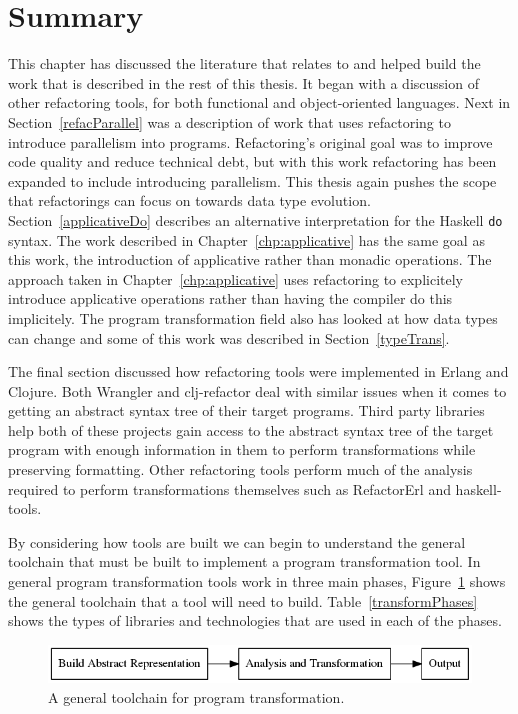 \section{Summary}

This chapter has discussed the literature that relates to and helped build the work that is described in the rest of this thesis. It began with a discussion of other refactoring tools, for both functional and object-oriented languages. Next in Section~\ref{refacParallel} was a description of work that uses refactoring to introduce parallelism into programs. Refactoring's original goal was to improve code quality and reduce technical debt, but with this work refactoring has been expanded to include introducing parallelism. This thesis again pushes the scope that refactorings can focus on towards data type evolution. Section~\ref{applicativeDo} describes an alternative interpretation for the Haskell \texttt{do} syntax. The work described in Chapter~\ref{chp:applicative} has the same goal as this work, the introduction of applicative rather than monadic operations. The approach taken in Chapter~\ref{chp:applicative} uses refactoring to explicitely introduce applicative operations rather than having the compiler do this implicitely. The program transformation field also has looked at how data types can change and some of this work was described in Section~\ref{typeTrans}. 

The final section discussed how refactoring tools were implemented in Erlang and Clojure. Both Wrangler and clj-refactor deal with similar issues when it comes to getting an abstract syntax tree of their target programs. Third party libraries help both of these projects gain access to the abstract syntax tree of the target program with enough information in them to perform transformations while preserving formatting. Other refactoring tools perform much of the analysis required to perform transformations themselves such as RefactorErl and haskell-tools.

By considering how tools are built we can begin to understand the general toolchain that must be built to implement a program transformation tool. In general program transformation tools work in three main phases, Figure~\ref{generalToolchain} shows the general toolchain that a tool will need to build. Table~\ref{transformPhases} shows the types of libraries and technologies that are used in each of the phases. 

\begin{figure}[t]
	\begin{center}
		\includegraphics[scale=.5]{graphVis/RelatedWork/abstractTooling.png}
	\end{center}
	\caption{A general toolchain for program transformation.}
	\label{generalToolchain}
\end{figure}

